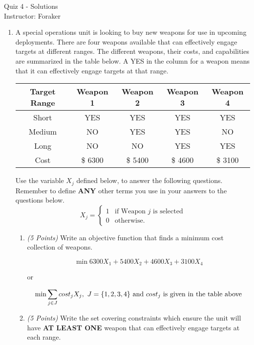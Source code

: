 \documentclass[10pt]{article}
\newcommand{\binvar}[1]{\left\{
    \begin{array}{ll}
      1 & \mbox{#1} \\
      0 & \mbox{otherwise.}
    \end{array}
    \right.}
\begin{document}
\begin{center}
  {\sc Quiz 4 - Solutions}\\
  {\sc Instructor: Foraker}
\end{center}

\newcommand{\points}[1]{{\it (#1 Points)}}

\begin{enumerate}
\item A special operations unit is looking to buy new weapons for use in upcoming deployments.  There are four weapons available that can effectively engage targets at different ranges.  The different weapons, their costs, and capabilities are summarized in the table below.  A YES in the column for a weapon means that it can effectively engage targets at that range.

 \begin{center}
    \begin{tabular}{c||c|c|c|c}
      Target Range & Weapon 1 & Weapon 2 & Weapon 3 & Weapon 4 \\
      \hline
      \hline
      Short & YES & YES & YES & YES \\
      \hline
      Medium & NO & YES & YES & NO \\
      \hline
      Long & NO & NO & YES & YES \\
      \hline
      \hline
      Cost & \$ 6300 & \$ 5400 & \$ 4600 & \$ 3100 \\
     \hline
    \end{tabular}
  \end{center}

Use the variable $X_j$ defined below, to answer the following questions.  Remember to define {\bf ANY} other terms you use in your answers to the questions below.
  \[
  X_{j} = \binvar{if Weapon $j$ is selected}
  \]

\begin{enumerate}
\item \points{5} Write an objective function that finds a minimum cost collection of weapons.

\[
\min 6300 X_1 + 5400 X_2 + 4600 X_3 + 3100 X_4
\]

or

\[
\min \sum_{j \in J} cost_j X_j, ~ J = \{1,2,3,4\} ~ {\rm and}~ cost_j ~ {\rm is~given~in~the~table~above}
\]

\vfill

\item \points{5} Write the set covering constraints which ensure the unit will have {\bf AT LEAST ONE} weapon that can effectively engage targets at each range.


\end{enumerate}
\end{enumerate}
\end{document}
